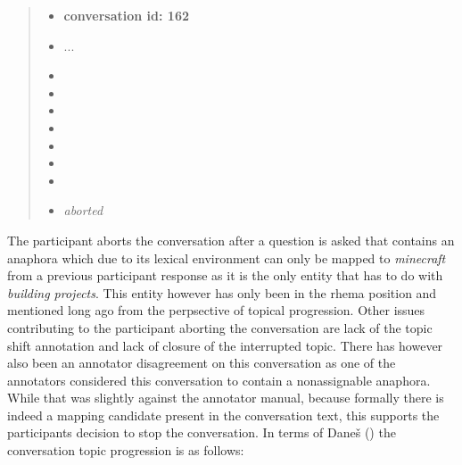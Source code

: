     \begin{quote}
    \begin{itemize}[label={}, leftmargin=0pt, itemsep=0.5em]
    \item \textbf{conversation id: 162}
    \item ...
    \item {}
    \item {}
    \item {}
    \item {}
    \item {}
    \item {}
    \item {}
    \item \textit{aborted}
    \end{itemize}
    \end{quote}

    The participant aborts the conversation after a question is asked that contains an anaphora
    which due to its lexical environment can only be mapped to \textit{minecraft} from a previous participant response
    as it is the only entity that has to do with \textit{building projects}.
    This entity however has only been in the rhema position and mentioned long ago from the perpsective of topical progression.
    Other issues contributing to the participant aborting the conversation are lack of the topic shift annotation
    and lack of closure of the interrupted topic.
    There has however also been an annotator disagreement on this conversation
    as one of the annotators considered this conversation to contain a nonassignable anaphora.
    While that was slightly against the annotator manual,
    because formally there is indeed a mapping candidate present in the conversation text,
    this supports the participants decision to stop the conversation.
    In terms of Daneš () the conversation topic progression is as follows:


